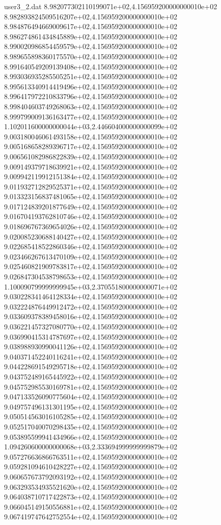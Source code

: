 \begin{filecontents}{user3_2.dat}
8.982077302110199071e+02,4.156959200000000010e+02
8.982893824509516207e+02,4.156959200000000010e+02
8.984876494669009617e+02,4.156959200000000010e+02
8.986274861434845889e+02,4.156959200000000010e+02
8.990020986854459579e+02,4.156959200000000010e+02
8.989655898360175570e+02,4.156959200000000010e+02
8.991640549209139408e+02,4.156959200000000010e+02
8.993036935285505251e+02,4.156959200000000010e+02
8.995613340914419496e+02,4.156959200000000010e+02
8.996417972210833796e+02,4.156959200000000010e+02
8.998404603749268063e+02,4.156959200000000010e+02
8.999799009136163477e+02,4.156959200000000010e+02
1.102011600000000044e+03,2.446604000000000099e+02
9.003180046061493158e+02,4.156959200000000010e+02
9.005168658289396717e+02,4.156959200000000010e+02
9.006561082986822839e+02,4.156959200000000010e+02
9.009149379718639921e+02,4.156959200000000010e+02
9.009942119912151384e+02,4.156959200000000010e+02
9.011932712829525371e+02,4.156959200000000010e+02
9.013323156837481065e+02,4.156959200000000010e+02
9.017124839201877649e+02,4.156959200000000010e+02
9.016704193762810746e+02,4.156959200000000010e+02
9.018696767369654026e+02,4.156959200000000010e+02
9.020085230688140427e+02,4.156959200000000010e+02
9.022685418522860346e+02,4.156959200000000010e+02
9.023466267613470109e+02,4.156959200000000010e+02
9.025460821909783817e+02,4.156959200000000010e+02
9.026847304538798653e+02,4.156959200000000010e+02
1.100090799999999945e+03,2.370551800000000071e+02
9.030228341464128334e+02,4.156959200000000010e+02
9.032224876449912472e+02,4.156959200000000010e+02
9.033609378389458016e+02,4.156959200000000010e+02
9.036221457327080770e+02,4.156959200000000010e+02
9.036990415314787697e+02,4.156959200000000010e+02
9.038988930990041126e+02,4.156959200000000010e+02
9.040371452240116241e+02,4.156959200000000010e+02
9.044228691549295718e+02,4.156959200000000010e+02
9.043752489165445922e+02,4.156959200000000010e+02
9.045752985530169781e+02,4.156959200000000010e+02
9.047133526090775604e+02,4.156959200000000010e+02
9.049757496131301195e+02,4.156959200000000010e+02
9.050514563016105285e+02,4.156959200000000010e+02
9.052517040070298435e+02,4.156959200000000010e+02
9.053895599941434966e+02,4.156959200000000010e+02
1.094260600000000068e+03,2.333694999999999879e+02
9.057276636866763511e+02,4.156959200000000010e+02
9.059281094610428227e+02,4.156959200000000010e+02
9.060657673792093192e+02,4.156959200000000010e+02
9.063293534935521620e+02,4.156959200000000010e+02
9.064038710717422873e+02,4.156959200000000010e+02
9.066045149150556881e+02,4.156959200000000010e+02
9.067419747642752554e+02,4.156959200000000010e+02

\end{filecontents}
